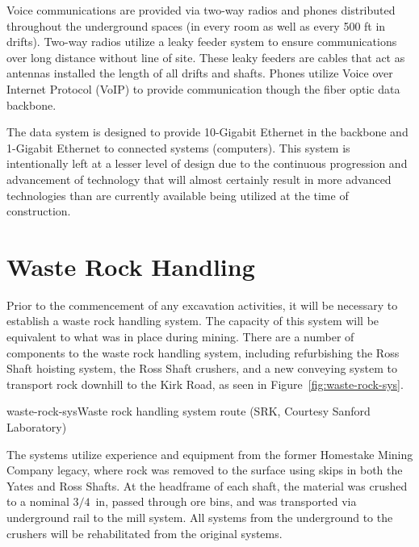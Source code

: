 Voice communications are provided via two-way radios and phones distributed throughout the underground spaces (in every room as well as every 500 ft in drifts). Two-way radios utilize a leaky feeder system to ensure communications over long distance without line of site. These leaky feeders are cables that act as antennas installed the length of all drifts and shafts. Phones utilize Voice over Internet Protocol (VoIP) to provide communication though the fiber optic data backbone.

The data system is designed to provide 10-Gigabit Ethernet in the backbone and 1-Gigabit Ethernet to connected systems (computers). This system is intentionally left at a lesser level of design due to the continuous progression and advancement of technology that will almost certainly result in more advanced technologies than are currently available being utilized at the time of construction.

\section{Waste Rock Handling }
\label{sec:fscf-und-waste-rock}

Prior to the commencement of any excavation activities, it will be necessary to establish a waste rock handling system. The capacity of this system will be equivalent to what was in place during mining. 
There are a number of components to the waste rock handling system, including refurbishing the Ross Shaft hoisting system, the Ross Shaft crushers, and a new conveying system to transport rock downhill to the Kirk Road, as seen in Figure~\ref{fig:waste-rock-sys}. 

\begin{cdrfigure}{waste-rock-sys}{Waste rock handling system route (SRK, Courtesy Sanford Laboratory)}
\end{cdrfigure}

The systems utilize experience and equipment from the former Homestake Mining Company legacy, where rock was removed to the surface using skips in both the Yates and Ross Shafts. At the headframe of each shaft, the material was crushed to a nominal $3/4$~in, passed through ore bins, and was transported via underground rail to the mill system. All systems from the underground to the crushers will be rehabilitated from the original systems.

